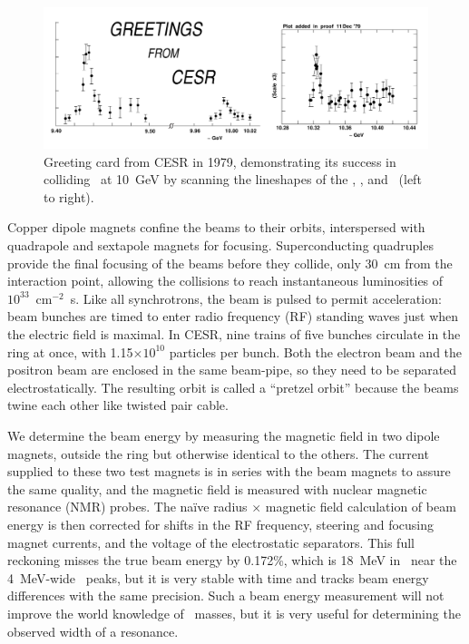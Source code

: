 \documentclass{cornell}
\begin{document}
\begin{figure}[p]
  \begin{center}
    \includegraphics[width=\linewidth]{plots/greetingsfromcesr}
  \end{center}
  \caption{\label{greetingsfromcesr} Greeting card from CESR in 1979,
  demonstrating its success in colliding \ee\ at 10~GeV by scanning
  the lineshapes of the \us, \uss, and \usss\ (left to right).}
\end{figure}

Copper dipole magnets confine the beams to their orbits, interspersed
with quadrapole and sextapole magnets for focusing.  Superconducting
quadruples provide the final focusing of the beams before they
collide, only 30~cm from the interaction point, allowing the
collisions to reach instantaneous luminosities of
$10^{33}$~cm$^{-2}$~s\inv.  Like all synchrotrons, the beam is pulsed
to permit acceleration: beam bunches are timed to enter radio
frequency (RF) standing waves just when the electric field is maximal.
In CESR, nine trains of five bunches circulate in the ring at once,
with 1.15$\times 10^{10}$ particles per bunch.  Both the electron beam
and the positron beam are enclosed in the same beam-pipe, so they need
to be separated electrostatically.  The resulting orbit is called a
``pretzel orbit'' because the beams twine each other like twisted pair
cable.

We determine the beam energy by measuring the magnetic field in two
dipole magnets, outside the ring but otherwise identical to the
others.  The current supplied to these two test magnets is in series
with the beam magnets to assure the same quality, and the magnetic
field is measured with nuclear magnetic resonance (NMR) probes.  The
na\"ive radius $\times$ magnetic field calculation of beam energy is
then corrected for shifts in the RF frequency, steering and focusing
magnet currents, and the voltage of the electrostatic separators.
This full reckoning misses the true beam energy by 0.172\%, which
is 18~MeV in \ecm\ near the 4~MeV-wide \ups\ peaks, but it is very
stable with time and tracks beam energy differences with the same
precision.  Such a beam energy measurement will not improve the world
knowledge of \ups\ masses, but it is very useful for determining
the observed width of a resonance.
\end{document}
